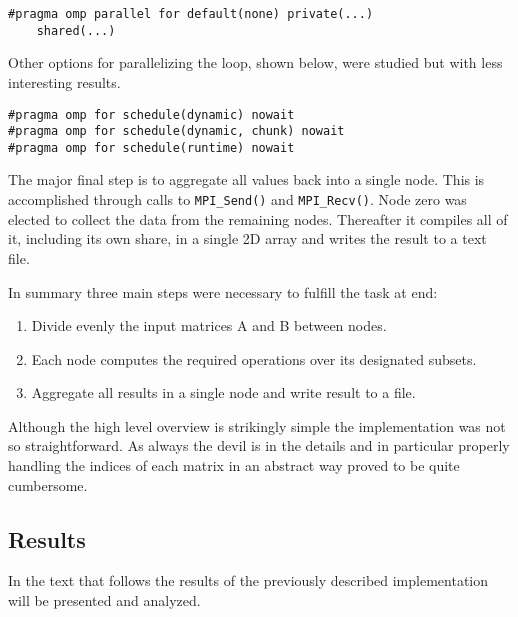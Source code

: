 \begin{lstlisting}
#pragma omp parallel for default(none) private(...)
	shared(...)
\end{lstlisting}

Other options for parallelizing the loop, shown below, were studied but with less interesting results.

\begin{lstlisting}
#pragma omp for schedule(dynamic) nowait
#pragma omp for schedule(dynamic, chunk) nowait
#pragma omp for schedule(runtime) nowait
\end{lstlisting}

The major final step is to aggregate all values back into a single node. This is accomplished through calls to \texttt{MPI\_Send()} and \texttt{MPI\_Recv()}.
Node zero was elected to collect the data from the remaining nodes. Thereafter it compiles all of it, including its own share, in a single 2D array and writes the result to a text file.

In summary three main steps were necessary to fulfill the task at end:
\begin{enumerate}
\item Divide evenly the input matrices A and B between nodes.
\item Each node computes the required operations over its designated subsets.
\item Aggregate all results in a single node and write result to a file.
\end{enumerate}

Although the high level overview is strikingly simple the implementation was not so straightforward. As always the devil is in the details and in particular properly handling the indices of each matrix in an abstract way proved to be quite cumbersome.

\subsection{Results}
\label{ssec:results}


In the text that follows the results of the previously described implementation will be presented and analyzed.

